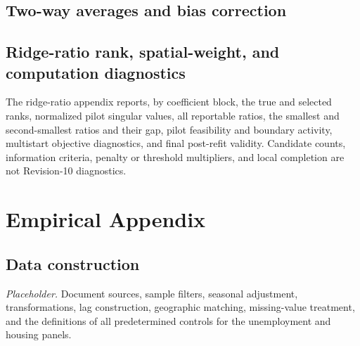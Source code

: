 \documentclass[11pt]{article}
\numberwithin{equation}{section}
\theoremstyle{remark}
\begin{document}
\subsection{Two-way averages and bias correction}





\subsection{Ridge-ratio rank, spatial-weight, and computation diagnostics}

The ridge-ratio appendix reports, by coefficient block, the true and selected ranks, normalized pilot singular values, all reportable ratios, the smallest and second-smallest ratios and their gap, pilot feasibility and boundary activity, multistart objective diagnostics, and final post-refit validity. Candidate counts, information criteria, penalty or threshold multipliers, and local completion are not Revision-10 diagnostics.



















\section{Empirical Appendix}
\label{app:empirical}

\subsection{Data construction}

\textit{Placeholder.} Document sources, sample filters, seasonal adjustment, transformations, lag construction, geographic matching, missing-value treatment, and the definitions of all predetermined controls for the unemployment and housing panels.
\end{document}
